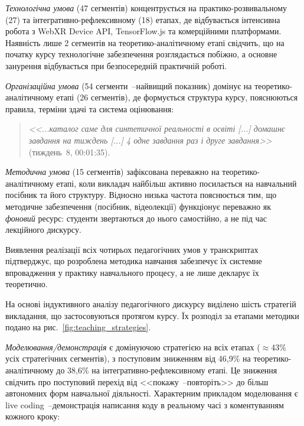 \textit{Технологічна умова} (47 сегментів) концентрується на практико-розвивальному (27) та інтегративно-рефлексивному (18) етапах, де відбувається інтенсивна робота з WebXR Device API, TensorFlow.js та комерційними платформами. Наявність лише 2 сегментів на теоретико-аналітичному етапі свідчить, що на початку курсу технологічне забезпечення розглядається побіжно, а основне занурення відбувається при безпосередній практичній роботі.

\textit{Організаційна умова} (54 сегменти~--найвищий показник) домінує на теоретико-аналітичному етапі (26 сегментів), де формується структура курсу, пояснюються правила, терміни здачі та система оцінювання:

\begin{quote}
\textit{<<...каталог саме для синтетичної реальності в освіті \textnormal{[...]} домашнє завдання на тиждень \textnormal{[...]} 4 одне завдання раз і друге завдання>>} (тиждень~8, 00:01:35).
\end{quote}

\textit{Методична умова} (15 сегментів) зафіксована переважно на теоретико-аналітичному етапі, коли викладач найбільш активно посилається на навчальний посібник та його структуру. Відносно низька частота пояснюється тим, що методичне забезпечення (посібник, відеолекції) функціонує переважно як \textit{фоновий} ресурс: студенти звертаються до нього самостійно, а не під час лекційного дискурсу.

Виявлення реалізації всіх чотирьох педагогічних умов у транскриптах підтверджує, що розроблена методика навчання забезпечує їх системне впровадження у практику навчального процесу, а не лише декларує їх теоретично.


На основі індуктивного аналізу педагогічного дискурсу виділено шість стратегій викладання, що застосовуються протягом курсу. Їх розподіл за етапами методики подано на рис.~\ref{fig:teaching_strategies}.



\textit{Моделювання/демонстрація} є домінуючою стратегією на всіх етапах ($\approx$43\% усіх стратегічних сегментів), з поступовим зниженням від 46,9\% на теоретико-аналітичному до 38,6\% на інтегративно-рефлексивному етапі. Це зниження свідчить про поступовий перехід від <<покажу~--повторіть>> до більш автономних форм навчальної діяльності. Характерним прикладом моделювання є live coding~--демонстрація написання коду в реальному часі з коментуванням кожного кроку:

